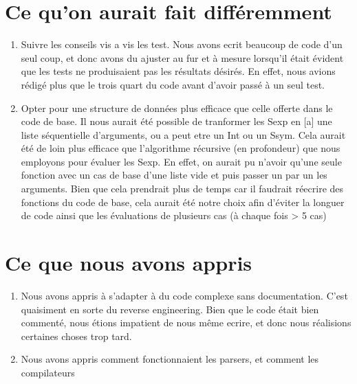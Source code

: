\documentclass{article}
\begin{document}
\section*{Ce qu'on aurait fait différemment}
\begin{enumerate}
    \item Suivre les conseils vis a vis les test. Nous avons ecrit beaucoup de code d'un seul coup, et donc avons du ajuster au fur et à mesure lorsqu'il était évident que les tests ne produisaient pas les résultats désirés. En effet, nous avions rédigé plus que le trois quart du code avant d'avoir passé à un seul test.
    \item Opter pour une structure de données plus efficace que celle offerte dans le code de base. Il nous aurait été possible de tranformer les Sexp en [a] une liste séquentielle d'arguments, ou a peut etre un Int ou un Ssym. Cela aurait été de loin plus efficace que l'algorithme récursive (en profondeur) que nous employons pour évaluer les Sexp. En effet, on aurait pu n'avoir qu'une seule fonction avec un cas de base d'une liste vide et puis passer un par un les arguments. Bien que cela prendrait plus de temps car il faudrait réecrire des fonctions du code de base, cela aurait été notre choix afin d'éviter la longuer de code ainsi que les évaluations de plusieurs cas (à chaque fois > 5 cas) 
\end{enumerate}

\section*{Ce que nous avons appris}
\begin{enumerate}
    \item Nous avons appris à s'adapter à du code complexe sans documentation. C'est quaisiment en sorte du reverse engineering. Bien que le code était bien commenté, nous étions impatient de nous même ecrire, et donc nous réalisions certaines choses trop tard. 

    \item Nous avons appris comment fonctionnaient les parsers, et comment les compilateurs
    
\end{enumerate}
\end{document}
